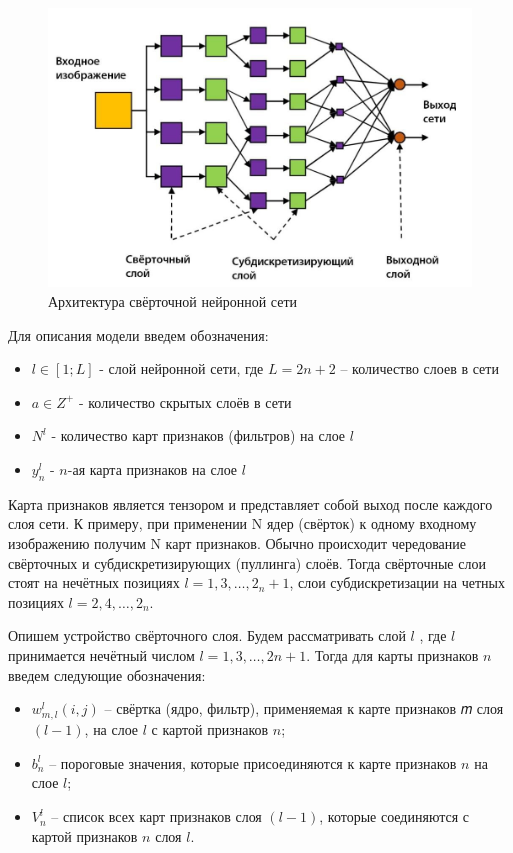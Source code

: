\begin{figure}[h]
\includegraphics[width=0.75\columnwidth]{./img/recur_6.jpg}
\centering
\caption{Архитектура свёрточной нейронной сети}
\label{pic:recur_6}
\end{figure}

Для описания модели введем обозначения:
\begin{itemize}
  \item $l \in \left[1;L\right]$ - слой нейронной сети, где $L=2n+2$ – количество слоев в сети
  \item $a \in Z^{+}$ - количество скрытых слоёв в сети
  \item $N^l$ - количество карт признаков (фильтров) на слое $l$
  \item $y_n^l$ - $n$-ая карта признаков на слое $l$
\end{itemize}

Карта признаков является тензором и представляет собой выход после каждого слоя сети. 
К примеру, при применении N ядер (свёрток) к одному входному изображению получим N карт признаков. 
Обычно происходит чередование свёрточных и субдискретизирующих (пуллинга) слоёв. 
Тогда свёрточные слои стоят на нечётных позициях $l=1,3,…,2_n+1$, слои субдискретизации на четных позициях $l=2,4,…,2_n$.

Опишем устройство свёрточного слоя. Будем рассматривать слой $l$
, где $l$ принимается нечётный числом $l=1,3,…,2n+1$. Тогда для карты признаков $n$ введем следующие обозначения:

\begin{itemize}
  \item $w_{m,l}^l(i,j)$ – свёртка (ядро, фильтр), применяемая к карте признаков 𝑚 слоя $(l-1)$, на слое $l$ с картой признаков $n$;
  \item $b_n^l$ – пороговые значения, которые присоединяются к карте признаков $n$ на слое $l$;
  \item $V_n^l$ – список всех карт признаков слоя $(l-1)$, которые соединяются с картой признаков $n$ слоя $l$.
\end{itemize}

